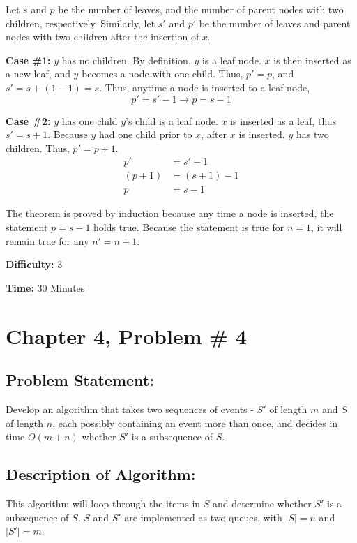\documentclass{article}
\begin{document}
\noindent Let $s$ and $p$ be the number of leaves, and the number of parent nodes with two children, respectively.  Similarly, let $s'$ and $p'$ be the number of leaves and parent nodes with two children after the insertion of $x$.

\textbf{Case \#1:} $y$ has no children. \newline
By definition, $y$ is a leaf node. $x$ is then inserted as a new leaf, and $y$ becomes a node with one child.  Thus, $p' = p$, and $s' = s + (1 - 1) = s$.
Thus, anytime a node is inserted to a leaf node, $$p' = s' - 1 \rightarrow p = s - 1 $$ 

\textbf{Case \#2:} $y$ has one child \newline
$y$'s child is a leaf node.  $x$ is inserted as a leaf, thus $s' = s + 1$.
Because $y$ had one child prior to $x$, after $x$ is inserted, $y$ has two children.  Thus, $p' = p + 1$.
\begin{align*}
p' &= s' - 1 \\
(p + 1) &= (s + 1) - 1 \\
p &= s - 1
\end{align*} 

\noindent The theorem is proved by induction because any time a node is inserted, the statement $p = s - 1$ holds true.  Because the statement is true for $n=1$, it will remain true for any $n' = n+1$.

\noindent \textbf{Difficulty:}  3

\noindent \textbf{Time:}  30 Minutes

\newpage
\section*{Chapter 4, Problem \# 4}
\subsection*{Problem Statement:}
Develop an algorithm that takes two sequences of events - $S'$ of length $m$ and $S$ of length $n$, each possibly containing an event more than once, and decides in time $O(m+n)$ whether $S'$ is a subsequence of $S$.

\subsection*{Description of Algorithm:}
This algorithm will loop through the items in $S$ and determine whether $S'$ is a subsequence of $S$.
$S$ and $S'$ are implemented as two queues, with $\mid S \mid = n$ and $\mid S' \mid = m$.
\end{document}
